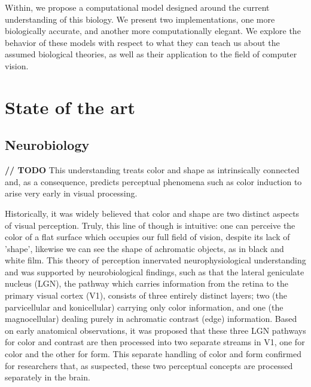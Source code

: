 \documentclass[journal,onecolumn]{IEEEtran}
\begin{document}
Within, we propose a computational model designed around the current understanding of this biology. We present two implementations, one more biologically accurate, and another more computationally elegant. We explore the behavior of these models with respect to what they can teach us about the assumed biological theories, as well as their application to the field of computer vision.


%
%
%
\section{State of the art}


\subsection{Neurobiology}


\textbf{// TODO} This understanding treats color and shape as intrinsically connected and, as a consequence, predicts perceptual phenomena such as color induction to arise very early in visual processing.

Historically, it was widely believed that color and shape are two distinct aspects of visual perception. Truly, this line of though is intuitive: one can perceive the color of a flat surface which occupies our full field of vision, despite its lack of 'shape', likewise we can see the shape of achromatic objects, as in black and white film. This theory of perception innervated neurophysiological understanding and was supported by neurobiological findings, such as that the lateral geniculate nucleus (LGN), the pathway which carries information from the retina to the primary visual cortex (V1), consists of three entirely distinct layers; two (the parvicellular and konicellular) carrying only color information, and one (the magnocellular) dealing purely in achromatic contrast (edge) information. Based on early anatomical observations, it was proposed that these three LGN pathways for color and contrast are then processed into two separate streams in V1, one for color and the other for form. This separate handling of color and form confirmed for researchers that, as suspected, these two perceptual concepts are processed separately in the brain.
\end{document}
